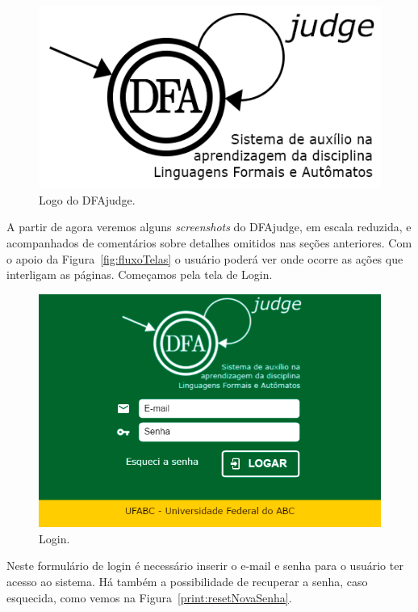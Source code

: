 \documentclass[
	12pt,				%
	openany,
	oneside,
	a4paper,			%
	english,			%
	brazil				%
	]{abntex2}
\begin{document}
\begin{figure}[H]
  \centering
  \includegraphics[scale=0.6]{prints/logo.png}
  \caption{Logo do DFAjudge.}
  \label{fig:logoDFAjudge}
  \vspace{-0.5cm}
\end{figure}
    
  A partir de agora veremos alguns \textit{screenshots} do DFAjudge, em escala reduzida, e acompanhados de comentários sobre detalhes omitidos nas seções anteriores. Com o apoio da Figura~\ref{fig:fluxoTelas} o usuário poderá ver onde ocorre as ações que interligam as páginas. Começamos pela tela de Login. 
  
\begin{figure}[H]
  \centering
  \includegraphics[scale=0.5]{prints/login.png}
  \caption{Login.}
  \label{print:login}
  \vspace{-0.5cm}
\end{figure}

  Neste formulário de login é necessário inserir o e-mail e senha para o usuário ter acesso ao sistema. Há também a possibilidade de recuperar a senha, caso esquecida, como vemos na Figura~\ref{print:resetNovaSenha}.
\end{document}
